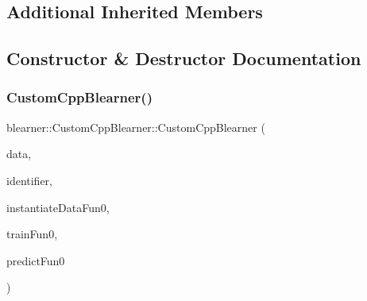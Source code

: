 \subsection*{Additional Inherited Members}


\subsection{Constructor \& Destructor Documentation}
\mbox{\label{classblearner_1_1_custom_cpp_blearner_a053eccfff8223ab0358b7f00ed02d263}} 
\subsubsection{\texorpdfstring{Custom\+Cpp\+Blearner()}{BaselearnerCustomCpp()}}
{\footnotesize\ttfamily blearner\+::\+Custom\+Cpp\+Blearner\+::\+Custom\+Cpp\+Blearner (\begin{DoxyParamCaption}\item[{\mbox{\hyperlink{classdata_1_1_data}{data\+::\+Data}} $\ast$}]{data,  }\item[{const std\+::string \&}]{identifier,  }\item[{S\+E\+XP}]{instantiate\+Data\+Fun0,  }\item[{S\+E\+XP}]{train\+Fun0,  }\item[{S\+E\+XP}]{predict\+Fun0 }\end{DoxyParamCaption})}

